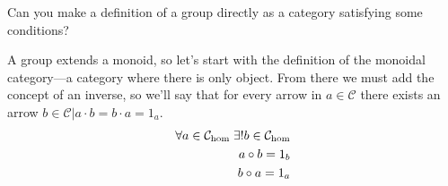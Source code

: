 \begin{ttta}
	Can you make a definition of a group directly as a category satisfying some conditions?
\end{ttta}

A group extends a monoid, so let's start with the definition of the monoidal
category---a category where there is only object. From there we must add the
concept of an inverse, so we'll say that for every arrow in $a \in \mathcal{C}$
there exists an arrow $b\in\mathcal{C}| a\cdot b = b\cdot a = 1_a$.
\begin{align*}
	\forall a \in \mathcal{C}_{\text{hom}}{}\;\exists! b \in \mathcal{C}_{\text{hom}}{} \\
	a \circ b = 1_b                             \\
	b \circ a = 1_a
\end{align*}
